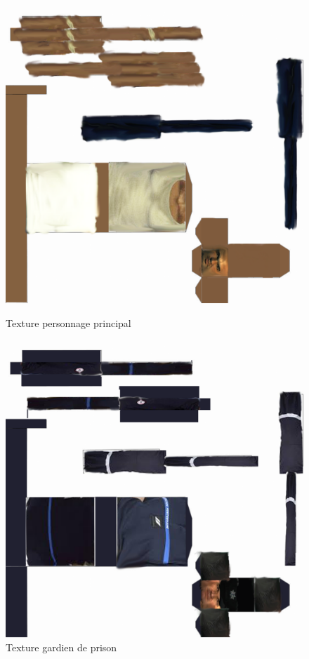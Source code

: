 \documentclass[12pt]{article}
\begin{document}
\begin{figure}[htbp]
\begin{minipage}[c]{.45\linewidth}
\begin{center}
\includegraphics[scale=2]{michaelphotoshop.png}
\caption{Texture personnage principal}
\label{fig:michaelphotoshop}
\end{center}
\end{minipage}
\hfill
\begin{minipage}[c]{.45\linewidth}
\begin{center}
\includegraphics[scale=2]{bellikphotoshop.png}
\caption{Texture gardien de prison}
\label{fig:bellikphotoshop}
\end{center}
\end{minipage}
\end{figure}
\end{document}
